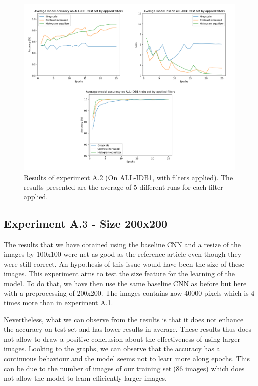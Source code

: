\documentclass[11pt, openany]{report}
\theoremstyle{plain}
\theoremstyle{definition}
\theoremstyle{remark}
\begin{document}
\begin{figure}[H]
  \centering
  \includegraphics[scale=0.5]{Code/ch6-LeukemiaSubtypes/figures_result/ALL_IDB1/all_idb1-filters.PNG}
  \caption{Results of experiment A.2 (On ALL-IDB1, with filters applied). The results presented are the average of 5 different runs for each filter applied.}
  \label{fig:results-A2}
\end{figure}

\subsection{Experiment A.3 - Size 200x200} \label{sec:size-allidb1}
The results that we have obtained using the baseline CNN and a resize of the images by 100x100 were not as good as the reference article \cite{leukemia} even though they were still correct. An hypothesis of this issue would have been the size of these images. This experiment aims to test the size feature for the learning of the model. To do that, we have then use the same baseline CNN as before but here with a preprocessing of 200x200. The images contains now 40000 pixels which is 4 times more than in experiment A.1.

Nevertheless, what we can observe from the results is that it does not enhance the accuracy on test set and has lower results in average. These results thus does not allow to draw a positive conclusion about the effectiveness of using larger images. Looking to the graphs, we can observe that the accuracy has a continuous behaviour and the model seems not to learn more along epochs. This can be due to the number of images of our training set (86 images) which does not allow the model to learn efficiently larger images. 
\end{document}
